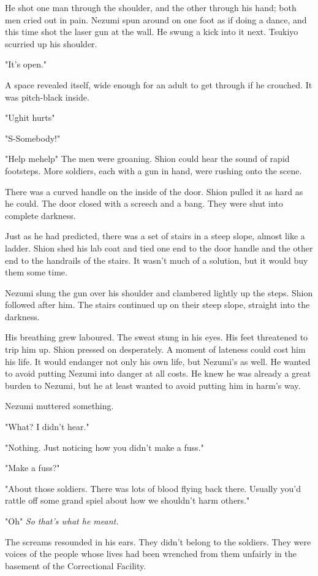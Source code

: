 He shot one man through the shoulder, and the other through his hand;
both men cried out in pain. Nezumi spun around on one foot as if doing a
dance, and this time shot the laser gun at the wall. He swung a kick
into it next. Tsukiyo scurried up his shoulder.

"It's open."

A space revealed itself, wide enough for an adult to get through if he
crouched. It was pitch-black inside.

"Ugh\el it hurts\el "

"S-Somebody!"

"Help me\el help\el " The men were groaning. Shion could hear the sound
of rapid footsteps. More soldiers, each with a gun in hand, were rushing
onto the scene.

There was a curved handle on the inside of the door. Shion pulled it as
hard as he could. The door closed with a screech and a bang. They were
shut into complete darkness.

Just as he had predicted, there was a set of stairs in a steep slope,
almost like a ladder. Shion shed his lab coat and tied one end to the
door handle and the other end to the handrails of the stairs. It wasn't
much of a solution, but it would buy them some time.

Nezumi slung the gun over his shoulder and clambered lightly up the
steps. Shion followed after him. The stairs continued up on their steep
slope, straight into the darkness.

His breathing grew laboured. The sweat stung in his eyes. His feet
threatened to trip him up. Shion pressed on desperately. A moment of
lateness could cost him his life. It would endanger not only his own
life, but Nezumi's as well. He wanted to avoid putting Nezumi into
danger at all costs. He knew he was already a great burden to Nezumi,
but he at least wanted to avoid putting him in harm's way.

Nezumi muttered something.

"What? I didn't hear."

"Nothing. \el Just noticing how you didn't make a fuss."

"Make a fuss?"

"About those soldiers. There was lots of blood flying back there.
Usually you'd rattle off some grand spiel about how we shouldn't harm
others."

"Oh\el " \emph{So that's what he meant.}

The screams resounded in his ears. They didn't belong to the soldiers.
They were voices of the people whose lives had been wrenched from them
unfairly in the basement of the Correctional Facility.

